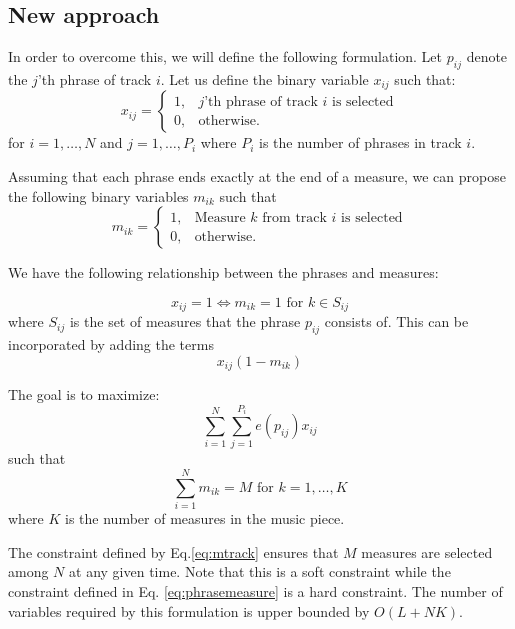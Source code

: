 \documentclass[11pt,a4paper]{article}
\begin{document}
\subsection{New approach}
In order to overcome this, we will define the following formulation. Let $ p_{ij} $ denote the $ j $'th phrase of track $ i $. Let us define the binary variable $x_{ij}$ such that:
\begin{equation}
x_{ij} =   \begin{cases}%
1,      & \text{$j$'th phrase of track $i$ is selected}\\
0, & \text{otherwise.}
\end{cases}
\end{equation}
 for $ i = 1, \dots ,N $ and $ j=1, \dots ,P_i  $ where $P_i$ is the number of phrases in track $i$.


Assuming that each phrase ends exactly at the end of a measure, we can propose the following binary variables $m_{ik}$ such that
\begin{equation}
m_{ik} =   \begin{cases}%
1,      & \text{Measure $k$ from track $i$ is selected}\\
0, & \text{otherwise.}
\end{cases}
\end{equation}

We have the following relationship between the phrases and measures:
 
\begin{equation}\label{eq:phrasemeasure}
x_{ij} = 1 \iff m_{ik}=1 \mbox{ for } k \in S_{ij}
\end{equation}
 where $S_{ij}$ is the set of measures that the phrase $p_{ij}$ consists of. This can be incorporated by adding the terms 
 \begin{equation}
 x_{ij}(1-m_{ik})
 \end{equation}
 
 The goal is to maximize:
 \begin{equation}
 \sum_{i=1}^N\sum_{j=1}^{P_i} e(p_{ij})x_{ij}
 \end{equation}
 such that
 \begin{equation}\label{eq:mtrack}
\sum_{i=1}^N m_{ik} = M \mbox{ for }k=1,\dots, K 
\end{equation}
 where $K$ is the number of measures in the music piece. 
 
 The constraint defined by Eq.\eqref{eq:mtrack} ensures that $M$ measures are selected among $ N $ at any given time. Note that this is a soft constraint while the constraint defined in Eq. \ref{eq:phrasemeasure} is a hard constraint. The number of variables required by this formulation is upper bounded by $ O(L+NK) $.
 
\end{document}
